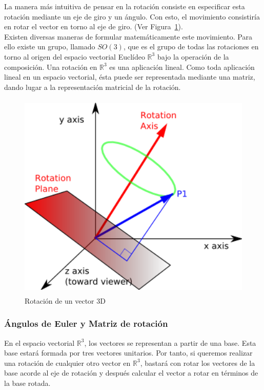 La manera más intuitiva de pensar en la rotación consiste en especificar esta
rotación mediante un eje de giro y un ángulo. Con esto, el movimiento
consistiría en rotar el vector en torno al eje de giro. (Ver
Figura~\ref{fig:rotacion}). \\

Existen diversas maneras de formular matemáticamente este movimiento. Para ello
existe un grupo, llamado $SO(3)$, que es el grupo de todas las rotaciones en
torno al origen del espacio vectorial Euclídeo $\mathbb{R}^3$ bajo la operación
de la composición. Una rotación en $\mathbb{R}^3$ es una aplicación lineal. Como
toda aplicación lineal en un espacio vectorial, ésta puede ser representada
mediante una matriz, dando lugar a la representación matricial de la rotación.

\begin{figure}
	\centering		
	\includegraphics[height=10cm]{figures/rotation.png}
	\caption{Rotación de un vector 3D}
	\label{fig:rotacion}
\end{figure}

\subsubsection{Ángulos de Euler y Matriz de rotación}
\label{makereference5.4.2.1}

En el espacio vectorial $\mathbb{R}^3$, los vectores se representan a partir de
una base. Esta base estará formada por tres vectores unitarios. Por tanto, si
queremos realizar una rotación de cualquier otro vector en $\mathbb{R}^3$,
bastará con rotar los vectores de la base acorde al eje de rotación y después
calcular el vector a rotar en términos de la base rotada. \\

